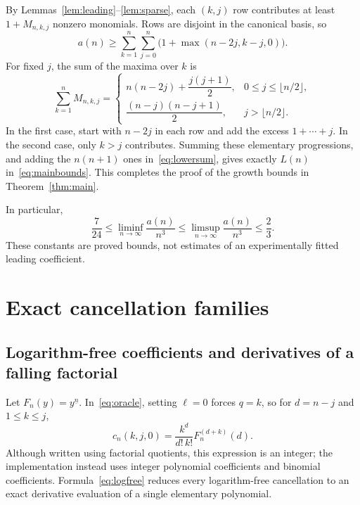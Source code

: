 \documentclass[11pt]{article}
\numberwithin{equation}{section}
\theoremstyle{definition}
\theoremstyle{remark}
\newcommand{\fall}[2]{#1^{\underline{#2}}}
\begin{document}
By Lemmas~\ref{lem:leading}--\ref{lem:sparse}, each $(k,j)$ row contributes at
least $1+M_{n,k,j}$ nonzero monomials. Rows are disjoint in the canonical
basis, so
\begin{equation}\label{eq:lowersum}
 a(n)\ge\sum_{k=1}^n\sum_{j=0}^n
 \bigl(1+\max(n-2j,k-j,0)\bigr).
\end{equation}
For fixed $j$, the sum of the maxima over $k$ is
\begin{equation}\label{eq:Mslice}
 \sum_{k=1}^n M_{n,k,j}=
 \begin{cases}
 n(n-2j)+\dfrac{j(j+1)}2,&0\le j\le\lfloor n/2\rfloor,\\[5pt]
 \dfrac{(n-j)(n-j+1)}2,&j>\lfloor n/2\rfloor.
 \end{cases}
\end{equation}
In the first case, start with $n-2j$ in each row and add the excess
$1+\cdots+j$. In the second case, only $k>j$ contributes.
Summing these elementary progressions, and adding the $n(n+1)$ ones
in~\eqref{eq:lowersum}, gives exactly $L(n)$ in~\eqref{eq:mainbounds}.
This completes the proof of the growth bounds in Theorem~\ref{thm:main}.

In particular,
\begin{equation}\label{eq:limbounds}
 \frac7{24}\le\liminf_{n\to\infty}\frac{a(n)}{n^3}
 \le\limsup_{n\to\infty}\frac{a(n)}{n^3}\le\frac23.
\end{equation}
These constants are proved bounds, not estimates of an experimentally fitted
leading coefficient.

\section{Exact cancellation families}

\subsection{Logarithm-free coefficients and derivatives of a falling factorial}

Let $F_n(y)=\fall{y}{n}$. In~\eqref{eq:oracle}, setting $\ell=0$ forces
$q=k$, so for $d=n-j$ and $1\le k\le j$,
\begin{equation}\label{eq:logfree}
\boxed{\displaystyle
 c_n(k,j,0)=\frac{k^d}{d!\,k!}F_n^{(d+k)}(d).}
\end{equation}
Although written using factorial quotients, this expression is an integer;
the implementation instead uses integer polynomial coefficients and binomial
coefficients. Formula~\eqref{eq:logfree} reduces every logarithm-free
cancellation to an exact derivative evaluation of a single elementary
polynomial.
\end{document}
